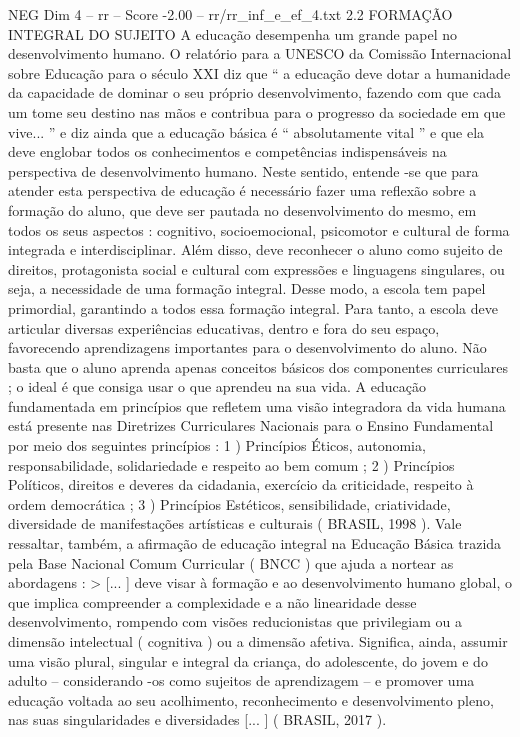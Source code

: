 \begin{textsample}{NEG Dim 4 – rr – Score -2.00 – rr/rr\_inf\_e\_ef\_4.txt}  \label{ex:f4_neg_178}
2.2 FORMAÇÃO INTEGRAL DO SUJEITO A educação desempenha um grande papel no desenvolvimento humano.
O relatório para a UNESCO da Comissão Internacional sobre Educação para o século XXI diz que “ a educação deve dotar a humanidade da capacidade de dominar o seu próprio desenvolvimento, fazendo com que cada um tome seu destino nas mãos e contribua para o progresso da sociedade em que vive... ” e diz ainda que a educação básica é “ absolutamente vital ” e que ela deve englobar todos os conhecimentos e competências indispensáveis na perspectiva de desenvolvimento humano.
Neste sentido, entende -se que para atender esta perspectiva de educação é necessário fazer uma reflexão sobre a formação do aluno, que deve ser pautada no desenvolvimento do mesmo, em todos os seus aspectos : cognitivo, socioemocional, psicomotor e cultural de forma integrada e interdisciplinar.
Além disso, deve reconhecer o aluno como sujeito de direitos, protagonista social e cultural com expressões e linguagens singulares, ou seja, a necessidade de uma formação integral.
Desse modo, a escola tem papel primordial, garantindo a todos essa formação integral.
Para tanto, a escola deve articular diversas experiências educativas, dentro e fora do seu espaço, favorecendo aprendizagens importantes para o desenvolvimento do aluno.
Não basta que o aluno aprenda apenas conceitos básicos dos componentes curriculares ; o ideal é que consiga usar o que aprendeu na sua vida.
A educação fundamentada em princípios que refletem uma visão integradora da vida humana está presente nas Diretrizes Curriculares Nacionais para o Ensino Fundamental por meio dos seguintes princípios : 1 ) Princípios Éticos, autonomia, responsabilidade, solidariedade e respeito ao bem comum ; 2 ) Princípios Políticos, direitos e deveres da cidadania, exercício da criticidade, respeito à ordem democrática ; 3 ) Princípios Estéticos, sensibilidade, criatividade, diversidade de manifestações artísticas e culturais ( BRASIL, 1998 ).
Vale ressaltar, também, a afirmação de educação integral na Educação Básica trazida pela Base Nacional Comum Curricular ( BNCC ) que ajuda a nortear as abordagens : > [... ] deve visar à formação e ao desenvolvimento humano global, o que implica compreender a complexidade e a não linearidade desse desenvolvimento, rompendo com visões reducionistas que privilegiam ou a dimensão intelectual ( cognitiva ) ou a dimensão afetiva.
Significa, ainda, assumir uma visão plural, singular e integral da criança, do adolescente, do jovem e do adulto – considerando -os como sujeitos de aprendizagem – e promover uma educação voltada ao seu acolhimento, reconhecimento e desenvolvimento pleno, nas suas singularidades e diversidades [... ] ( BRASIL, 2017 ).

\end{textsample}
